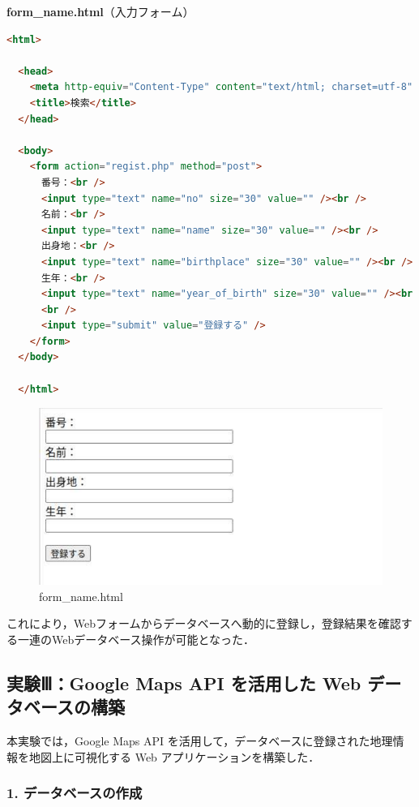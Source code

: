 \textbf{form\_name.html}（入力フォーム）

\begin{lstlisting}[language=html]
  <html>

  <head>
    <meta http-equiv="Content-Type" content="text/html; charset=utf-8" />
    <title>検索</title>
  </head>
  
  <body>
    <form action="regist.php" method="post">
      番号：<br />
      <input type="text" name="no" size="30" value="" /><br />
      名前：<br />
      <input type="text" name="name" size="30" value="" /><br />
      出身地：<br />
      <input type="text" name="birthplace" size="30" value="" /><br />
      生年：<br />
      <input type="text" name="year_of_birth" size="30" value="" /><br />
      <br />
      <input type="submit" value="登録する" />
    </form>
  </body>
  
  </html>
\end{lstlisting}
\begin{figure}[htbp]
  \centering
  \includegraphics[width=0.9\linewidth]{figure/9.pdf}
  \caption{form\_name.html}
\end{figure}


これにより，Webフォームからデータベースへ動的に登録し，登録結果を確認する一連のWebデータベース操作が可能となった．

\subsection*{実験Ⅲ：Google Maps API を活用した Web データベースの構築}

本実験では，Google Maps API を活用して，データベースに登録された地理情報を地図上に可視化する Web アプリケーションを構築した．

\subsubsection*{1. データベースの作成}

